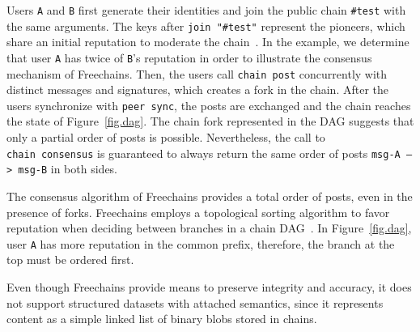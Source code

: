 \documentclass[12pt]{article}
\newcommand{\code}[1]  {\texttt{\footnotesize{#1}}}
\begin{document}
Users \code{A} and \code{B} first generate their identities and join the
public chain \code{\#test} with the same arguments.
The keys after \code{join~"\#test"} represent the pioneers, which share an
initial reputation to moderate the chain~\cite{fcs.sbseg20}.
In the example, we determine that user \code{A} has twice of \code{B}'s
reputation in order to illustrate the consensus mechanism of Freechains.
Then, the users call \code{chain~post} concurrently with distinct messages and
signatures, which creates a fork in the chain.
%
After the users synchronize with \code{peer~sync}, the posts are exchanged and
the chain reaches the state of Figure~\ref{fig.dag}.
The chain fork represented in the DAG suggests that only a partial order of
posts is possible.
Nevertheless, the call to \code{chain~consensus} is guaranteed to always
return the same order of posts \code{msg-A~-->~msg-B} in both sides.

The consensus algorithm of Freechains provides a total order of posts, even in
the presence of forks.
Freechains employs a topological sorting algorithm to favor reputation when
deciding between branches in a chain DAG~\cite{fcs.sbseg20}.
%
In Figure~\ref{fig.dag}, user \code{A} has more reputation in the common
prefix, therefore, the branch at the top must be ordered first.

Even though Freechains provide means to preserve integrity and accuracy, it
does not support structured datasets with attached semantics, since it
represents content as a simple linked list of binary blobs stored in chains.
\end{document}

